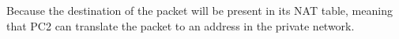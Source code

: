 Because the destination of the packet will be present in its NAT table, meaning that PC2 can translate the packet to an address in the private network.
